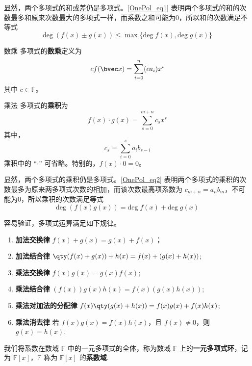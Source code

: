 显然，两个多项式的和或差仍是多项式。\autoref{OnePol_eq1} 表明两个多项式的和的次数最多和原来次数最大的多项式一样，而系数之和可能为0，所以和的次数满足不等式
\begin{equation}\label{OnePol_eq3}
\mathrm{deg}\;(f(x)\pm g(x))\leq \max\{\mathrm{deg}\;f(x),\mathrm{deg}\;g(x)\}
\end{equation}
\begin{definition}{数乘}
多项式的\textbf{数乘}定义为
\begin{equation}
cf(\bvec x)=\sum_{i=0}^n (ca_i)x^i
\end{equation}
其中 $c\in\mathbb F$。
\end{definition}

\begin{definition}{乘法}
多项式的\textbf{乘积}为
\begin{equation}
f(x)\cdot g(x)=\sum_{s=0}^{m+n} c_s x^s
\label{OnePol_eq2}
\end{equation}
其中，
\begin{equation}
c_s=\sum_{i=0}^s a_i b_{s-i}
\end{equation}
乘积中的 “$\cdot$” 可省略。特别的，$f(x)\cdot 0=0$。
\end{definition}

显然，两个多项式的乘积仍是多项式。\autoref{OnePol_eq2} 表明两个多项式的乘积的次数最多为原来两多项式次数的相加，而该次数最高项系数为 $c_{m+n}=a_n b_m$，不可能为0，所以乘积的次数满足等式
\begin{equation}\label{OnePol_eq4}
\mathrm{deg}\;(f(x)g(x))= \mathrm{deg}\;f(x)+\mathrm{deg}\;g(x)
\end{equation}

容易验证，多项式运算满足如下规律。
\begin{enumerate}
\item \textbf{加法交换律} $f(x)+g(x)=g(x)+f(x)$；
\item \textbf{加法结合律} $\qty(f(x)+g(x))+h(x)=f(x)+(g(x)+h(x))$;
\item \textbf{乘法交换律} $f(x)g(x)=g(x)f(x)$;
\item \textbf{乘法结合律} $(f(x))g(x)h(x)=f(x)(g(x)h(x))$;
\item \textbf{乘法对加法的分配律} $f(x)\qty(g(x)+h(x))=f(x)g(x)+f(x)h(x)$;
\item \textbf{乘法消去律} 若 $f(x)g(x)=f(x)h(x)$，且 $f(x)\neq0$，则 $g(x)=h(x)$.
\end{enumerate}
我们将系数在数域 $\mathbb{F}$ 中的一元多项式的全体，称为数域 $\mathbb{F}$ 上的\textbf{一元多项式环}，记为 $\mathbb{F}[x]$，$\mathbb{F}$ 称为 $\mathbb{F}[x]$ 的\textbf{系数域}.

